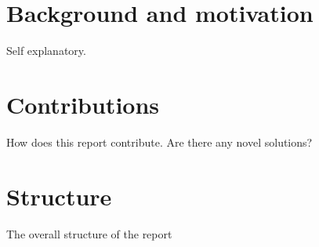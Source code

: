 \section*{Background and motivation}
Self explanatory. 
\section*{Contributions}
How does this report contribute. Are there any novel solutions?
\section*{Structure}
The overall structure of the report
